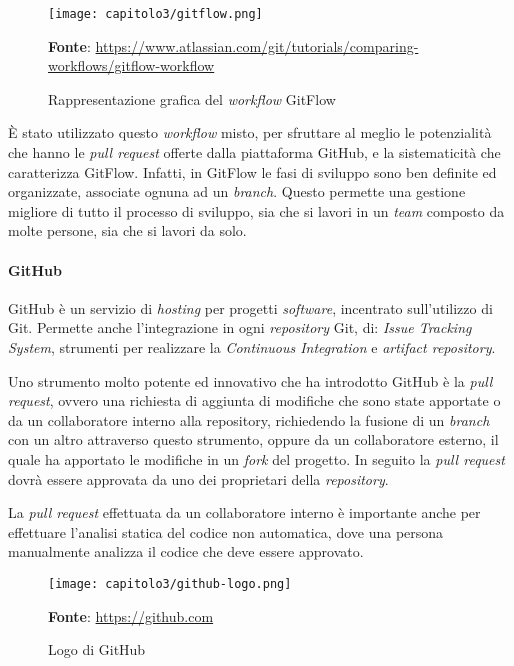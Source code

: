 \begin{figure}[h!]
  \centering
  \texttt{[image: capitolo3/gitflow.png]}
  \caption{Rappresentazione grafica del \textit{workflow} GitFlow}
  \textbf{Fonte}: \href{https://www.atlassian.com/git/tutorials/comparing-workflows/gitflow-workflow}{https://www.atlassian.com/git/tutorials/comparing-workflows/gitflow-workflow}
\end{figure}

È stato utilizzato questo \textit{workflow} misto, per sfruttare al meglio le potenzialità che hanno le \textit{pull request} offerte dalla piattaforma GitHub, e la sistematicità che caratterizza GitFlow. Infatti, in GitFlow le fasi di sviluppo sono ben definite ed organizzate, associate ognuna ad un \textit{branch}. Questo permette una gestione migliore di tutto il processo di sviluppo, sia che si lavori in un \textit{team} composto da molte persone, sia che si lavori da solo.

\paragraph{GitHub}
GitHub è un servizio di \textit{hosting} per progetti \textit{software}, incentrato sull'utilizzo di Git. Permette anche l'integrazione in ogni \textit{repository} Git, di: \textit{Issue Tracking System}, strumenti per realizzare la \textit{Continuous Integration} e \textit{artifact repository}. 

Uno strumento molto potente ed innovativo che ha introdotto GitHub è la \textit{pull request}, ovvero una richiesta di aggiunta di modifiche che sono state apportate o da un collaboratore interno alla repository, richiedendo la fusione di un \textit{branch} con un altro attraverso questo strumento, oppure da un collaboratore esterno, il quale ha apportato le modifiche in un \textit{fork} del progetto. In seguito la \textit{pull request} dovrà essere approvata da uno dei proprietari della \textit{repository}. 

La \textit{pull request} effettuata da un collaboratore interno è importante anche per effettuare l'analisi statica del codice non automatica, dove una persona manualmente analizza il codice che deve essere approvato.

\begin{figure}[h!]
  \centering
  \texttt{[image: capitolo3/github-logo.png]}
  \caption{Logo di GitHub}
  \textbf{Fonte}: \href{https://github.com}{https://github.com}
\end{figure}

